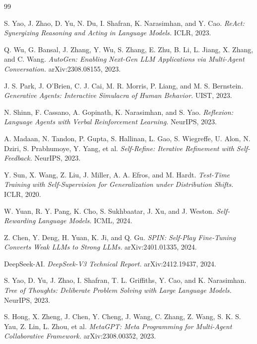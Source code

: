 \documentclass[11pt,a4paper]{article}
\begin{document}

\begin{thebibliography}{99}

S. Yao, J. Zhao, D. Yu, N. Du, I. Shafran, K. Narasimhan, and Y. Cao.
\textit{ReAct: Synergizing Reasoning and Acting in Language Models.}
ICLR, 2023.

Q. Wu, G. Bansal, J. Zhang, Y. Wu, S. Zhang, E. Zhu, B. Li, L. Jiang, X. Zhang, and C. Wang.
\textit{AutoGen: Enabling Next-Gen LLM Applications via Multi-Agent Conversation.}
arXiv:2308.08155, 2023.

J. S. Park, J. O'Brien, C. J. Cai, M. R. Morris, P. Liang, and M. S. Bernstein.
\textit{Generative Agents: Interactive Simulacra of Human Behavior.}
UIST, 2023.

N. Shinn, F. Cassano, A. Gopinath, K. Narasimhan, and S. Yao.
\textit{Reflexion: Language Agents with Verbal Reinforcement Learning.}
NeurIPS, 2023.

A. Madaan, N. Tandon, P. Gupta, S. Hallinan, L. Gao, S. Wiegreffe, U. Alon, N. Dziri, S. Prabhumoye, Y. Yang, et al.
\textit{Self-Refine: Iterative Refinement with Self-Feedback.}
NeurIPS, 2023.

Y. Sun, X. Wang, Z. Liu, J. Miller, A. A. Efros, and M. Hardt.
\textit{Test-Time Training with Self-Supervision for Generalization under Distribution Shifts.}
ICLR, 2020.

W. Yuan, R. Y. Pang, K. Cho, S. Sukhbaatar, J. Xu, and J. Weston.
\textit{Self-Rewarding Language Models.}
ICML, 2024.

Z. Chen, Y. Deng, H. Yuan, K. Ji, and Q. Gu.
\textit{SPIN: Self-Play Fine-Tuning Converts Weak LLMs to Strong LLMs.}
arXiv:2401.01335, 2024.

DeepSeek-AI.
\textit{DeepSeek-V3 Technical Report.}
arXiv:2412.19437, 2024.

S. Yao, D. Yu, J. Zhao, I. Shafran, T. L. Griffiths, Y. Cao, and K. Narasimhan.
\textit{Tree of Thoughts: Deliberate Problem Solving with Large Language Models.}
NeurIPS, 2023.

S. Hong, X. Zheng, J. Chen, Y. Cheng, J. Wang, C. Zhang, Z. Wang, S. K. S. Yau, Z. Lin, L. Zhou, et al.
\textit{MetaGPT: Meta Programming for Multi-Agent Collaborative Framework.}
arXiv:2308.00352, 2023.


\end{thebibliography}
\end{document}
